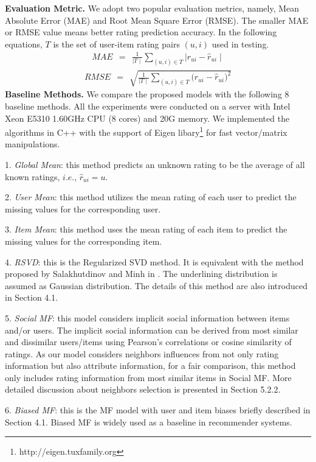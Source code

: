 \documentclass{llncs}
\begin{document}
	\noindent\textbf{Evaluation Metric.} We adopt two popular evaluation metrics, namely, Mean Absolute Error (MAE) and Root Mean Square Error (RMSE).
	The smaller MAE or RMSE value means better rating prediction accuracy. In the following equations, $T$ is the set of user-item rating pairs $(u, i )$ used in testing.
	\begin{eqnarray*}
		MAE~~=~~\frac{1}{\mid T\mid}\sum_{(u,i)\in T} {\mid r_{ui}-\hat{r}_{ui}\mid}
	\end{eqnarray*}
	\begin{eqnarray*}
		RMSE~~=~~\sqrt{\frac{1}{\mid T\mid}\sum_{(u,i)\in T} {(r_{ui}-\hat{r}_{ui}})^2}
	\end{eqnarray*}
	\noindent\textbf{Baseline Methods.} We compare the proposed models with the following 8 baseline methods. All the experiments were conducted on a server with Intel Xeon E5310 1.60GHz CPU (8 cores) and 20G memory. We
	implemented the algorithms in C++ with the support of Eigen libary\footnote{http://eigen.tuxfamily.org} for fast vector/matrix manipulations.
	
	1. \emph{Global Mean}: this method predicts an unknown rating to be
	the average of all known ratings, $i.e.$, $\hat{r}_{ui}= u$.
	
	2. \emph{User Mean}: this method utilizes the mean rating of each user
	to predict the missing values for the corresponding user.
	
	3. \emph{Item Mean}: this method uses the mean rating of each item to
	predict the missing values for the corresponding item.
	
	4. \emph{RSVD}: this is the Regularized SVD method. It is
	equivalent with the method proposed by Salakhutdinov and Minh in \cite{5-1-1}.
	The underlining distribution is assumed as Gaussian distribution.
	The details of this method are also introduced in Section 4.1.
	
	5. \emph{Social MF}: this model considers implicit social information
	between items and/or users. The implicit social information
	can be derived from most similar and dissimilar users/items
	using Pearson's correlations or cosine similarity of ratings.
	As our model considers neighbors influences from not only rating information
	but also attribute information, for a fair comparison, this method only includes rating information from most similar items in Social MF.
	More detailed discussion about neighbors selection is presented in Section 5.2.2.
	
	6. \emph{Biased MF}: this is the MF model with user and item biases
	briefly described in Section 4.1. Biased MF is widely used
	as a baseline in recommender systems.
	
\end{document}
